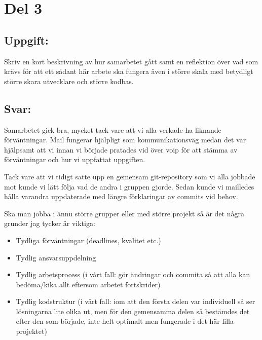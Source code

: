 \documentclass[10pt, a4paper]{article}
\begin{document}
\cleardoublepage

\section*{Del 3}\label{sec:del3}

\subsection*{Uppgift:}
Skriv en kort beskrivning av hur samarbetet gått samt en reflektion över vad som krävs för att ett sådant här arbete ska fungera även i större skala med betydligt större skara utvecklare och större kodbas.
 
\subsection*{Svar:}

Samarbetet gick bra, mycket tack vare att vi alla verkade ha liknande förväntningar. Mail fungerar hjälpligt som kommunikationsväg medan det var hjälpsamt att vi innan vi började pratades vid över voip för att stämma av förväntningar och hur vi uppfattat uppgiften.

Tack vare att vi tidigt satte upp en gemensam git-repository som vi alla jobbade mot kunde vi lätt följa vad de andra i gruppen gjorde. Sedan kunde vi mailledes hålla varandra uppdaterade med längre förklaringar av commits vid behov.

Ska man jobba i ännu större grupper eller med större projekt så är det några grunder jag tycker är viktiga:

\begin{itemize}
     \item Tydliga förväntningar (deadlines, kvalitet etc.)
     \item Tydlig ansvarsuppdelning
     \item Tydlig arbetsprocess (i vårt fall: gör ändringar och commita så att alla kan bedöma/kika allt eftersom arbetet fortskrider)
     \item Tydlig kodstruktur (i vårt fall: iom att den första delen var individuell så ser lösningarna lite olika ut, men för den gemensamma delen så bestämdes det efter den som började, inte helt optimalt men fungerade i det här lilla projektet)
 \end{itemize}




%  
\end{document}
